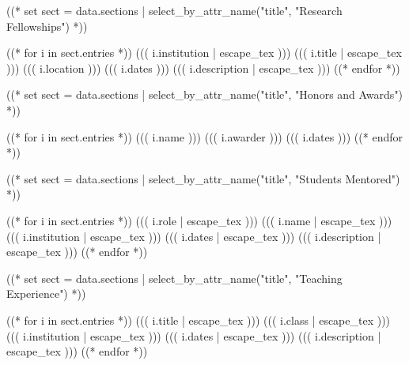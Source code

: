 \documentclass[10pt, letterpaper]{awesome-cv}
\begin{document}
((* set sect = data.sections | select_by_attr_name("title", "Research Fellowships") *))
\begin{cventries}
((* for i in sect.entries *))
\cventry
  {((( i.institution | escape_tex )))}
  {((( i.title | escape_tex )))}
  {((( i.location )))}
  {((( i.dates )))}
  {((( i.description | escape_tex )))}
((* endfor *))
\end{cventries}

((* set sect = data.sections | select_by_attr_name("title", "Honors and Awards") *))
\begin{cvhonors}
((* for i in sect.entries *))
\cvhonor
  {((( i.name )))}
  {((( i.awarder )))}
  {}
  {((( i.dates )))}
((* endfor *))
\end{cvhonors}

((* set sect = data.sections | select_by_attr_name("title", "Students Mentored") *))
\begin{cventries}
((* for i in sect.entries *))
\cventry
  {((( i.role | escape_tex )))}
  {((( i.name | escape_tex )))}
  {((( i.institution | escape_tex )))}
  {((( i.dates | escape_tex )))}
  {((( i.description | escape_tex )))}
((* endfor *))
\end{cventries}
((* set sect = data.sections | select_by_attr_name("title", "Teaching Experience") *))
\begin{cventries}
((* for i in sect.entries *))
\cventry
  {((( i.title | escape_tex )))}
  {((( i.class | escape_tex )))}
  {((( i.institution | escape_tex )))}
  {((( i.dates | escape_tex )))}
  {((( i.description | escape_tex )))}
((* endfor *))
\end{cventries}
\end{document}
